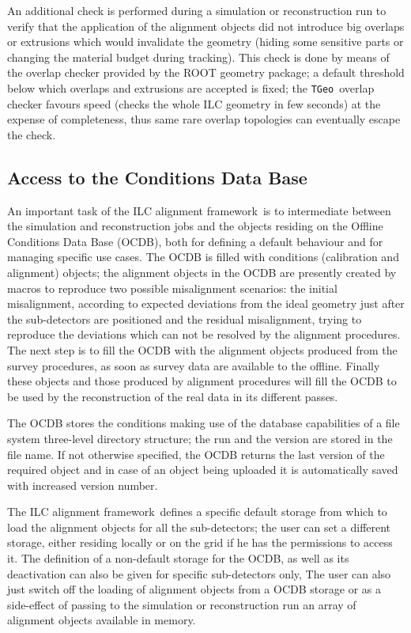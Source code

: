 \documentclass[12pt,a4paper,twoside]{article}
\makeatletter
\newcommand {\ROOT} {ROOT\@\xspace}
\newcommand{\FR}{ILC alignment framework}
\newcommand{\tgeo}{\lstinline!TGeo!}
\makeatother
\begin{document}
{An additional check is performed during a simulation or reconstruction
run to verify that the
application of the alignment objects did not introduce big overlaps
or extrusions which would invalidate the geometry (hiding some
sensitive parts or changing the material budget during tracking). This
check is done by means of the overlap checker provided by the
\ROOT geometry package; a default threshold below which overlaps and
extrusions are accepted is fixed; the \tgeo\ overlap checker favours speed
(checks the whole ILC geometry in few seconds) at the expense of
completeness, thus same rare overlap topologies can eventually escape
the check.

\subsection{Access to the Conditions Data Base}
\label{sec:CDBaccess}
An important task of the \FR\ is to intermediate between the
simulation and reconstruction jobs and the objects residing on the
Offline Conditions Data Base (OCDB), both for defining a default
behaviour and for managing specific use cases. The OCDB is filled
with conditions (calibration and alignment) objects; the alignment
objects in the OCDB are presently created by macros to reproduce two
possible misalignment scenarios: the initial misalignment, according
to expected deviations from the ideal geometry just after the
sub-detectors are positioned and the residual misalignment, trying to
reproduce the deviations which can not be resolved by the alignment
procedures. The next step is to fill the OCDB with the alignment
objects produced from the survey procedures, as soon as survey data
are available to the offline. Finally these objects and those produced
by alignment procedures will fill the OCDB to be used by the
reconstruction of the real data in its different passes.

The OCDB stores the conditions making use of the database capabilities
of a file system three-level directory structure; the run and the
version are stored in the file name.
If not otherwise specified, the OCDB returns the last version of the 
required object and in case of an object being uploaded it is
automatically saved with increased version number.

The \FR\ defines a specific default storage from which to load the
alignment objects for all the sub-detectors; the user can set a
different storage, either residing locally or on the grid if he has
the permissions to access it. The definition of a non-default storage
for the OCDB, as well as its deactivation can also be given for
specific sub-detectors only, The user can also just switch off the
loading of alignment objects from a OCDB storage or as a side-effect
of passing to the simulation or reconstruction run an array of
alignment objects available in memory.

}
\end{document}
